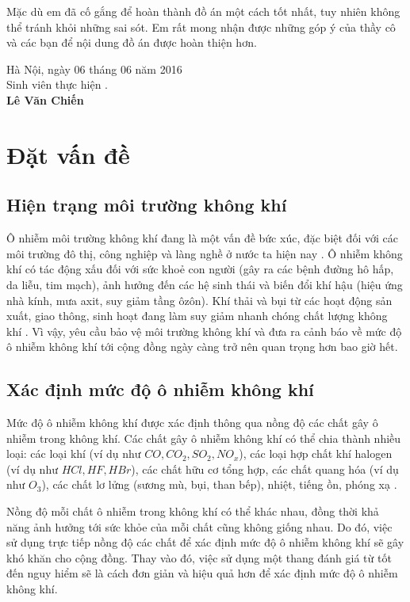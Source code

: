 \documentclass[14pt]{extreport}
\theoremstyle{definition}
\theoremstyle{plain}
\theoremstyle{remark}
\begin{document}
Mặc dù em đã cố gắng để hoàn thành đồ án một cách tốt nhất, tuy nhiên không thể tránh khỏi những sai sót. Em rất mong nhận được những góp ý của thầy cô và các bạn để nội dung đồ án được hoàn thiện hơn.

\begin{flushright}
Hà Nội, ngày 06 tháng 06 năm 2016\\[0.5cm]
{Sinh viên thực hiện \hspace*{1.4cm}.}\\[0.1cm]
\textbf{Lê Văn Chiến\hspace*{2.2cm}}
\end{flushright}

\chapter{Đặt vấn đề}
\section{Hiện trạng môi trường không khí}
Ô nhiễm môi trường không khí đang là một vấn đề bức xúc, đặc biệt đối với các môi trường đô thị, công nghiệp và làng nghề ở nước ta hiện nay \cite{HN2016}. Ô nhiễm không khí có tác động xấu đối với sức khoẻ con người (gây ra các bệnh đường hô hấp, da liễu, tim mạch), ảnh hưởng đến các hệ sinh thái và biến đổi khí hậu (hiệu ứng nhà kính, mưa axit, suy giảm tầng ôzôn). Khí thải và bụi từ các hoạt động sản xuất, giao thông, sinh hoạt đang làm suy giảm nhanh chóng chất lượng không khí \cite{Jianlin2015}. Vì vậy, yêu cầu bảo vệ môi trường không khí và đưa ra cảnh báo về mức độ ô nhiễm không khí tới cộng đồng ngày càng trở nên quan trọng hơn bao giờ hết.

\section{Xác định mức độ ô nhiễm không khí}
Mức độ ô nhiễm không khí được xác định thông qua nồng độ các chất gây ô nhiễm trong không khí. Các chất gây ô nhiễm không khí có thể chia thành nhiều loại: các loại khí (ví dụ như $CO, CO_2, SO_2, NO_x$), các loại hợp chất khí halogen (ví dụ như $HCl, HF, HBr$), các chất hữu cơ tổng hợp, các chất quang hóa (ví dụ như $O_3$), các chất lơ lửng (sương mù, bụi, than bếp), nhiệt, tiếng ồn, phóng xạ \cite{TCMT2011}. 

Nồng độ mỗi chất ô nhiễm trong không khí có thể khác nhau, đồng thời khả năng ảnh hưởng tới sức khỏe của mỗi chất cũng không giống nhau. Do đó, việc sử dụng trực tiếp nồng độ các chất để xác định mức độ ô nhiễm không khí sẽ gây khó khăn cho cộng đồng. Thay vào đó, việc sử dụng một thang đánh giá từ tốt đến nguy hiểm sẽ là cách đơn giản và hiệu quả hơn để xác định mức độ ô nhiễm không khí. 
\end{document}
